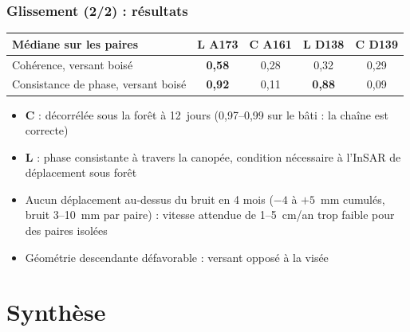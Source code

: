 \documentclass[aspectratio=169]{beamer}
\newcommand{\Lb}[1]{\textcolor{Lband}{\textbf{#1}}}
\newcommand{\Cb}[1]{\textcolor{Cband}{\textbf{#1}}}
\begin{document}
\begin{frame}{\phantom{x}}
	\frametitle{Glissement (2/2) : résultats}
	\vspace{-4pt}\scriptsize
	\centering
	\begin{tabular}{lcccc}
		\toprule
		Médiane sur les paires & \Lb{L A173} & \Cb{C A161} & \Lb{L D138} & \Cb{C D139}\\
		\midrule
		Cohérence, versant boisé & \textbf{0,58} & 0,28 & 0,32 & 0,29\\
		Consistance de phase, versant boisé & \textbf{0,92} & 0,11 & \textbf{0,88} & 0,09\\
		\bottomrule
	\end{tabular}

	\vspace{8pt}
	\raggedright
	\begin{itemize}
		\setlength{\itemsep}{2pt}
		\item \Cb{C} : décorrélée sous la forêt à 12~jours (0,97--0,99 sur le bâti : la chaîne est correcte)
		\item \Lb{L} : phase consistante à travers la canopée, condition nécessaire à l'InSAR de déplacement
		sous forêt
		\item Aucun déplacement au-dessus du bruit en 4 mois ($-4$ à $+5$~mm cumulés, bruit 3--10~mm par paire) :
		vitesse attendue de 1--5~cm/an trop faible pour des paires isolées
		\item Géométrie descendante défavorable : versant opposé à la visée
	\end{itemize}
\end{frame}

\section{Synthèse}
\end{document}
